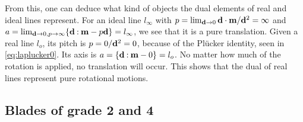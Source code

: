 From this, one can deduce what kind of objects the dual elements of real and ideal lines represent.  For an ideal line $l_\infty$ with $p = \lim_{\mathbf{d} \to 0} \mathbf{d} \mathbin{\cdot} \mathbf{m} / \mathbf{d}^2 = \infty$ and $a = \lim_{\mathbf{d} \to 0, p \to \infty} \{\mathbf{d} \mathbin{:} \mathbf{m} - p \mathbf{d}\} = l_\infty$, we see that it is a pure translation.  Given a real line $l_o$, its pitch is $p = 0 / \mathbf{d}^2 = 0$, because of the Pl\"ucker identity, seen in \autoref{eq:laplucker0}.  Its axis is $a = \{\mathbf{d} \mathbin{:} \mathbf{m} - 0\} = l_o$.  No matter how much of the rotation is applied, no translation will occur.  This shows that the dual of real lines represent pure rotational motions.
%


\subsection{Blades of grade 2 and 4}
